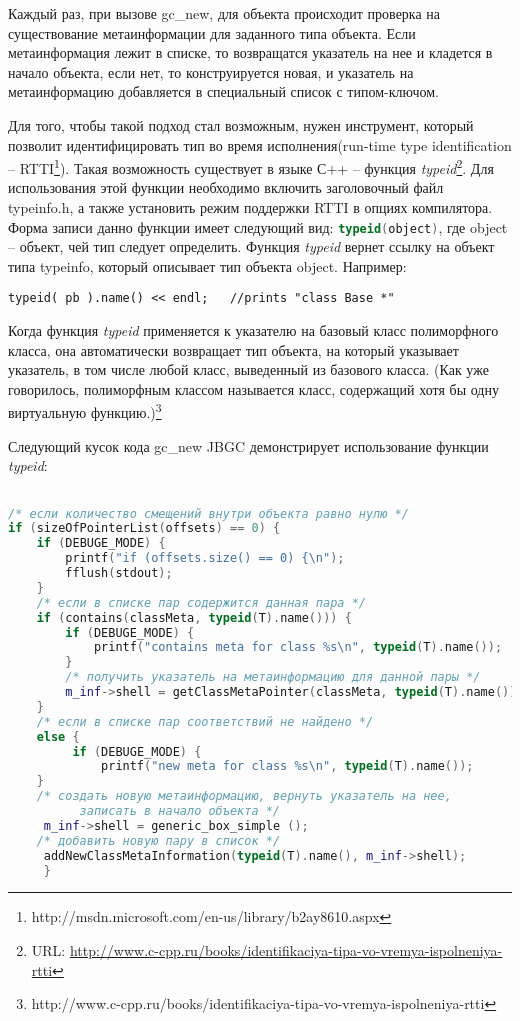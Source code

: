 Каждый раз, при вызове gc\_new, для объекта происходит проверка на существование метаинформации для заданного типа объекта. Если метаинформация лежит в списке, то возвращатся указатель на нее и кладется в начало объекта, если нет, то конструируется новая, и указатель на метаинформацию добавляется в  специальный список с типом-ключом.

Для того, чтобы такой подход стал возможным, нужен инструмент, который позволит идентифицировать тип во время исполнения(run-time type identification -- RTTI\footnote{ http://msdn.microsoft.com/en-us/library/b2ay8610.aspx}). Такая возможность существует в языке С++ -- функция \textit{typeid}\footnote{URL: \url{http://www.c-cpp.ru/books/identifikaciya-tipa-vo-vremya-ispolneniya-rtti}}. Для использования этой функции необходимо включить заголовочный файл typeinfo.h, а также установить режим поддержки RTTI в опциях компилятора. Форма записи данно функции имеет следующий вид:
\lstinline[language= C++]{typeid(object)}, где object -- объект, чей тип следует определить. Функция \textit{typeid} вернет ссылку на объект типа typeinfo, который описывает тип объекта object. 
Например:
\begin{lstlisting}
typeid( pb ).name() << endl;   //prints "class Base *"
\end{lstlisting}
Когда функция \textit{typeid} применяется к указателю на базовый класс полиморфного класса, она автоматически возвращает тип объекта, на который указывает указатель, в том числе любой класс, выведенный из базового класса. (Как уже говорилось, полиморфным классом называется класс, содержащий хотя бы одну виртуальную функцию.)\footnote{http://www.c-cpp.ru/books/identifikaciya-tipa-vo-vremya-ispolneniya-rtti}

Следующий кусок кода gc\_new JBGC демонстрирует использование функции \textit{typeid}:
\begin{lstlisting}[language= C++]

/* если количество смещений внутри объекта равно нулю */
if (sizeOfPointerList(offsets) == 0) { 
	if (DEBUGE_MODE) {
		printf("if (offsets.size() == 0) {\n");
		fflush(stdout);
	}
	/* если в списке пар содержится данная пара */
	if (contains(classMeta, typeid(T).name())) { 
		if (DEBUGE_MODE) {
			printf("contains meta for class %s\n", typeid(T).name());
		}
		/* получить указатель на метаинформацию для данной пары */
		m_inf->shell = getClassMetaPointer(classMeta, typeid(T).name());  
	}
	/* если в списке пар соответствий не найдено */ 
	else {
		 if (DEBUGE_MODE) {
			 printf("new meta for class %s\n", typeid(T).name());
 	}
	/* создать новую метаинформацию, вернуть указатель на нее,
	      записать в начало объекта */
	 m_inf->shell = generic_box_simple ();
	/* добавить новую пару в список */
	 addNewClassMetaInformation(typeid(T).name(), m_inf->shell); 
     }
\end{lstlisting}


